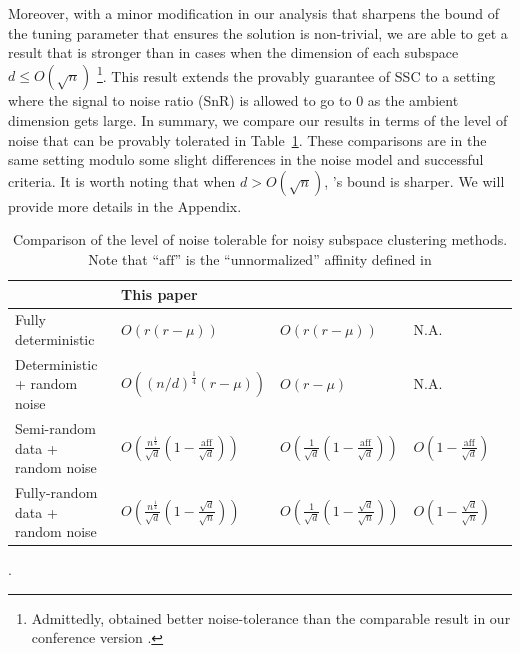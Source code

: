 \documentclass{ctexart}
\begin{document}
Moreover, with a minor modification in our analysis that sharpens the bound of the tuning parameter that ensures the solution is non-trivial, we are able to get a result that is stronger than \cite{soltanolkotabi2013robust} in cases when the dimension of each subspace $d\leq O(\sqrt{n})$ \footnote{Admittedly, \cite{soltanolkotabi2013robust} obtained better noise-tolerance than the comparable result in our conference version \cite{wang2013noisy}. }. This result extends the provably guarantee of SSC to a setting where the signal to noise ratio (SnR) is allowed to go to $0$ as the ambient dimension gets large. In summary, we compare our results in terms of the level of noise that can be provably tolerated in Table~\ref{tab:comparison}. These comparisons are in the same setting modulo some slight differences in the noise model and successful criteria. It is worth noting that when $d>O(\sqrt{n})$, \cite{soltanolkotabi2013robust}'s bound is sharper. We will provide more details in the Appendix.





\begin{table}
\centering
\small{
\begin{tabular}{|p{2.2in}|p{1.05in}|p{1in}|p{1in}|p{1.2in}|}
  \hline
   & This paper & \cite{wang2013noisy} & \cite{soltanolkotabi2013robust} \\\hline %
  Fully deterministic & $O(r(r-\mu))$ & $O(r(r-\mu))$ & N.A.  \\\hline
  Deterministic + random noise & $O((n/d)^{\frac{1}{4}}(r-\mu))$ & $O(r-\mu)$ & N.A.   \\\hline
  Semi-random data + random noise & $O\left(\frac{n^{\frac{1}{4}}}{\sqrt{d}}(1-\frac{\text{aff}}{\sqrt{d}})\right)$ & $O\left(\frac{1}{\sqrt{d}}(1-\frac{\text{aff}}{\sqrt{d}})\right)$ & $O\left(1-\frac{\text{aff}}{\sqrt{d}}\right)$  \\\hline
    Fully-random data + random noise & $O\left(\frac{n^{\frac{1}{4}}}{\sqrt{d}}(1-\frac{\sqrt{d}}{\sqrt{n}})\right)$ & $O\left(\frac{1}{\sqrt{d}}(1-\frac{\sqrt{d}}{\sqrt{n}})\right)$ & $O\left(1-\frac{\sqrt{d}}{\sqrt{n}}\right)$  \\
  \hline
\end{tabular}
}
\caption{Comparison of the level of noise tolerable for noisy subspace clustering methods. Note that ``$\mathrm{aff}$'' is the ``unnormalized'' affinity defined in \cite{soltanolkotabi2011geometric}}.\label{tab:comparison}
\end{table}
\end{document}
